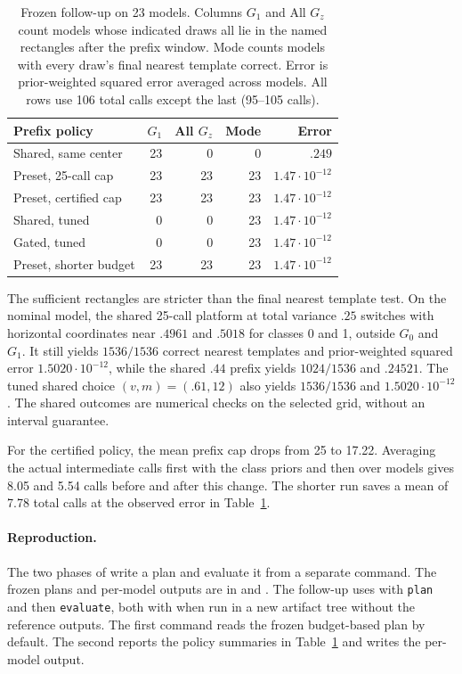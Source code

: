 \begin{table}[t]
\centering\small
\setlength{\tabcolsep}{2.8pt}
\begin{tabular}{@{}lrrrr@{}}
\toprule
Prefix policy & $G_1$ & All $G_z$ & Mode & Error\\
\midrule
Shared, same center & 23 & 0 & 0 & $.249$\\
Preset, 25-call cap & 23 & 23 & 23 & $1.47\cdot10^{-12}$\\
Preset, certified cap & 23 & 23 & 23 & $1.47\cdot10^{-12}$\\
Shared, tuned & 0 & 0 & 23 & $1.47\cdot10^{-12}$\\
Gated, tuned & 0 & 0 & 23 & $1.47\cdot10^{-12}$\\
Preset, shorter budget & 23 & 23 & 23 & $1.47\cdot10^{-12}$\\
\bottomrule
\end{tabular}
\caption{Frozen follow-up on 23 models. Columns $G_1$ and All
$G_z$ count models whose indicated draws all lie in the named
rectangles after the prefix window. Mode counts models with every
draw's final nearest template correct. Error is prior-weighted
squared error averaged across models.
All rows use 106 total calls except the last (95--105 calls).}
\label{tab:tuned_platforms}
\end{table}

The sufficient rectangles are stricter than the final nearest
template test. On the nominal model, the shared 25-call platform
at total variance $.25$ switches with horizontal coordinates
near $.4961$ and $.5018$ for classes 0 and 1, outside $G_0$ and
$G_1$. It still yields $1536/1536$ correct nearest templates and
prior-weighted squared error $1.5020\cdot10^{-12}$, while the
shared $.44$ prefix yields $1024/1536$ and $.24521$. The tuned
shared choice $(v,m)=(.61,12)$ also yields $1536/1536$ and
$1.5020\cdot10^{-12}$. The shared outcomes are numerical
checks on the selected grid, without an interval guarantee.

For the certified policy, the mean prefix cap drops from 25
to 17.22. Averaging the actual intermediate calls first with
the class priors and then over models gives 8.05 and 5.54 calls
before and after this change. The shorter run saves a mean of
7.78 total calls at the observed error in Table~\ref{tab:tuned_platforms}.

\paragraph{Reproduction.}
The two phases of
write a plan and evaluate it from a separate command.
The frozen plans and per-model outputs are in
 and
.
The follow-up uses 
with \texttt{plan} and then \texttt{evaluate}, both with
when run in a new artifact tree without the reference outputs.
The first command reads the frozen budget-based plan by default.
The second reports the policy summaries in
Table~\ref{tab:tuned_platforms} and writes the per-model output.
